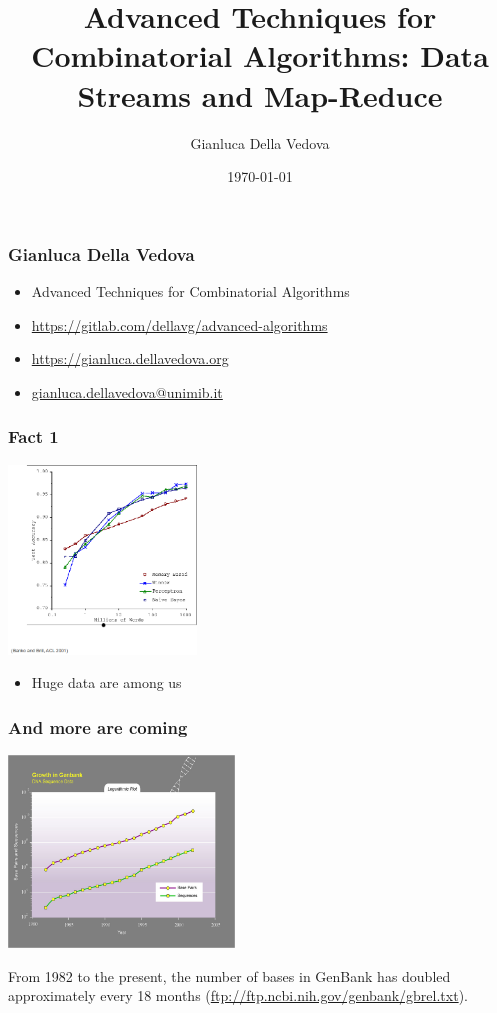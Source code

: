 \documentclass[12pt,aspectratio=169]{beamer}
\author{Gianluca Della Vedova}
\title[Advanced Algorithms]{Advanced Techniques for Combinatorial Algorithms:
Data Streams and Map-Reduce}
\institute[]{Univ. Milano--Bicocca\\
  \texttt{https://gianluca.dellavedova.org}}
\date[]{{\tiny \today\hspace{1em}}}
\begin{document}
\begin{frame}
  \titlepage
\end{frame}


\begin{frame}\frametitle{Gianluca Della Vedova}
  \begin{itemize}
  \item
                Advanced Techniques for Combinatorial Algorithms
\item
{\small\url{https://gitlab.com/dellavg/advanced-algorithms}}
  \item
{\small\url{https://gianluca.dellavedova.org}}
  \item
{\small\url{gianluca.dellavedova@unimib.it}}
  \end{itemize}
\end{frame}

\begin{frame}\frametitle{Fact 1}
  \includegraphics[width=5cm]{img/growing-data-1}
  \begin{itemize}
  \item
    Huge data are among us
  \end{itemize}
\end{frame}


\begin{frame}\frametitle{And more are coming}
  \includegraphics[width=6cm]{img/Kurzweil_DNA_Sequence_data_growth,_base_pairs_and_sequences_per_year}

  \small
  From 1982 to the present, the number of bases in GenBank has doubled
approximately every 18 months (\url{ftp://ftp.ncbi.nih.gov/genbank/gbrel.txt}).
\end{frame}
\end{document}
